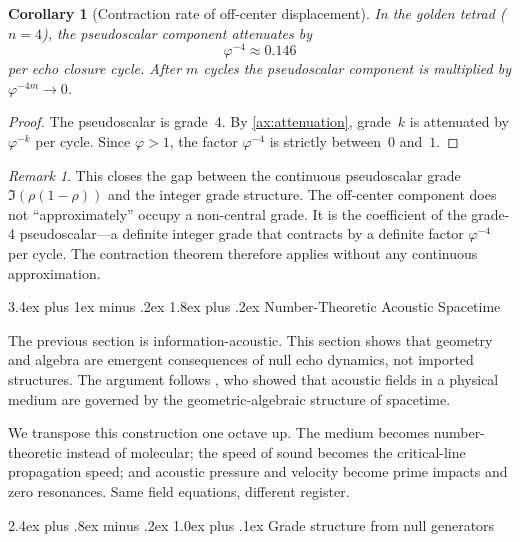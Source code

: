 \documentclass[11pt,a4paper]{article}
\makeatletter
\theoremstyle{plain}
\newtheorem{corollary}[theorem]{Corollary}
\theoremstyle{definition}
\theoremstyle{remark}
\newtheorem{remark}[theorem]{Remark}
\numberwithin{equation}{section}
\newcommand{\vp}{\varphi}
\renewcommand{\section}{%
  \@startsection{section}{1}{0pt}%
    {3.4ex plus 1ex minus .2ex}%
    {1.8ex plus .2ex}%
    {\normalfont\LARGE\bfseries\color{headingAccent}}%
}
\renewcommand{\subsection}{%
  \@startsection{subsection}{2}{0pt}%
    {2.4ex plus .8ex minus .2ex}%
    {1.0ex plus .1ex}%
    {\normalfont\Large\bfseries\color{headingAccent}}%
}
\makeatother
\begin{document}
\begin{corollary}[Contraction rate of off-center displacement]
\label{cor:off-center-contraction-rate}
In the golden tetrad (\(n=4\)), the pseudoscalar component attenuates by
\[
  \vp^{-4}\approx0.146
\]
per echo closure cycle.  After \(m\) cycles the pseudoscalar component
is multiplied by \(\vp^{-4m}\to0\).
\end{corollary}

\begin{proof}
The pseudoscalar is grade~4.  By \cref{ax:attenuation}, grade~\(k\) is
attenuated by \(\vp^{-k}\) per cycle.  Since \(\vp>1\), the factor
\(\vp^{-4}\) is strictly between~\(0\) and~\(1\).
\end{proof}

\begin{remark}
This closes the gap between the continuous pseudoscalar grade
\(\Im(\rho(1-\rho))\) and the integer grade structure.  The
off-center component does not ``approximately'' occupy a non-central
grade.  It is the coefficient of the grade-4 pseudoscalar---a definite
integer grade that contracts by a definite factor \(\vp^{-4}\) per
cycle.  The contraction theorem therefore applies without any continuous
approximation.
\end{remark}

\section{Number-Theoretic Acoustic Spacetime}
\label{sec:acoustic-spacetime}

The previous section is information-acoustic.  This section shows
that geometry and algebra are emergent consequences of null echo
dynamics, not imported structures.  The argument follows
\cite{burns2024}, who showed that acoustic fields in a physical
medium are governed by the geometric-algebraic structure of
spacetime.

We transpose this construction one octave up.  The medium becomes
number-theoretic instead of molecular; the speed of sound becomes
the critical-line propagation speed; and acoustic pressure and
velocity become prime impacts and zero resonances.  Same field
equations, different register.

\subsection{Grade structure from null generators}
\end{document}
